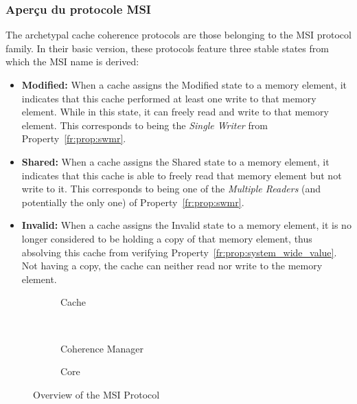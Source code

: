 \subsubsection{Aper\c{c}u du protocole MSI}
\label{fr:sec:intro_to_msi}
The archetypal cache coherence protocols are those belonging to the MSI
protocol family. In their basic version, these protocols feature three stable
states from which the MSI name is derived:
\begin{itemize}
\item \textbf{Modified:}
When a cache assigns the Modified state to a memory element, it indicates that
this cache performed at least one write to that memory element. While in this
state, it can freely read and write to that memory element. This corresponds
to being the \textit{Single Writer} from Property~\ref{fr:prop:swmr}.

\item \textbf{Shared:}
When a cache assigns the Shared state to a memory element, it indicates that
this cache is able to freely read that memory element but not write to it. This
corresponds to being one of the \textit{Multiple Readers} (and potentially the
only one) of Property~\ref{fr:prop:swmr}.

\item \textbf{Invalid:}
When a cache assigns the Invalid state to a memory element, it is no longer
considered to be holding a copy of that memory element, thus absolving this
cache from verifying Property~\ref{fr:prop:system_wide_value}. Not having a copy,
the cache can neither read nor write to the memory element.
\end{itemize}

\stopallthesefloats
\begin{figure}
   \begin{center}
   \begin{subfigure}[b]{0.7\linewidth}
      
      \caption{Cache}
      \label{fr:fig:general_msi_cc}
   \end{subfigure}
   \\
   \begin{subfigure}[b]{0.5\linewidth}
      
      \caption{Coherence Manager}
      \label{fr:fig:general_msi_cmgr}
   \end{subfigure}
   \begin{subfigure}[b]{0.3\linewidth}
      
      \caption{Core}
      \label{fr:fig:general_msi_cpu}
   \end{subfigure}
   \end{center}
   \caption{Overview of the MSI Protocol}
   \label{fr:fig:general_msi}
\end{figure}

